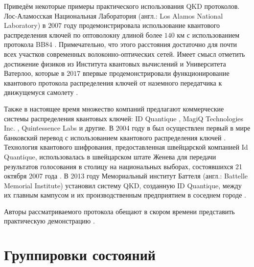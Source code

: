 \documentclass[a4paper,11pt]{article}
\begin{document}
Приведём некоторые примеры практического использования QKD протоколов. Лос-Аламосская Национальная Лаборатория (англ.: Los Alamos National Laboratory) в $2007$ году продемонстрировала использование квантового распределения ключей по оптоволокну длиной более $140$ км с использованием протокола BB84 \cite{Hiskett_2006,140}. Примечательно, что этого расстояния достаточно для почти всех участков современных волоконно-оптических сетей. Имеет смысл отметить достижение физиков из Института квантовых вычислений и Университета Ватерлоо, которые в $2017$ впервые продемонстрировали функционирование квантового протокола распределения ключей от наземного передатчика к движущемуся самолету \cite{airborne}.


Также в настоящее время множество компаний предлагают коммерческие системы распределения квантовых ключей: ID Quantique \cite{idq}, MagiQ Technologies Inc. \cite{magiq}, Quintessence Labs \cite{quin} и другие.
В 2004 году в был осуществлен первый в мире банковский перевод с использованием квантового распределения ключей \cite{bank}. Технология квантового шифрования, предоставленная швейцарской компанией Id Quantique, использовалась в швейцарском штате Женева для передачи результатов голосования в столицу на национальных выборах, состоявшихся 21 октября 2007 года \cite{swiss}. В 2013 году Мемориальный институт Баттеля (англ.: Battelle Memorial Institute) установил систему QKD, созданную ID Quantique, между их главным кампусом и их производственным предприятием в соседнем городе \cite{dublin}.

Авторы рассматриваемого протокола обещают в скором времени представить практическую демонстрацию \cite{base}.

\appendix
\section{Группировки состояний}\label{app}
\end{document}
